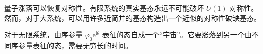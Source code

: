\begin{keypoints}
\item 量子涨落可以恢复对称性。有限系统的真实基态永远不可能破坏 $U(1)$ 对称性。然而，对于大系统，可以用许多近简并的基态构造出一个近似的对称性破缺基态。
\item 对于无限系统，由序参量 $\varphi_0\mathrm{e}^{\mathrm{i}\theta}$ 表征的态自成一个“宇宙”。它要涨落到另一个由不同序参量表征的态，需要无穷长的时间。
\end{keypoints}


